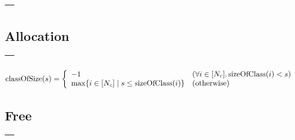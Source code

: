 \begin{center}
  \begin{tabular}{|p{}|}
    \hline
    \begin{algorithmic}
      \Ensure{$H$}
      \For{$i \in [N_c]$}
        \State{$V_i \assign (\mathrm{sizeOfClass(i)}, \epsilon)$}
      \EndFor
      \State{$H \assign (\{V_i\}_{i \in [N_c]}, \epsilon)$}
    \end{algorithmic}
    \\\hline
  \end{tabular}
\end{center}

\subsection{Allocation}

\begin{center}
  \begin{tabular}{|p{}|}
    \hline
    \begin{algorithmic}
      \Require{$H, s$}
      \Ensure{$H, b$}
      \State{$i = \mathrm{classOfSize}(s)$}
      \If{$i = -1$}
        \State{$b \assign \mathrm{allocFreeSize}(s)$}
      \Else
        \State{$V_i \assign \mathrm{subheap}_i(H)$}
        \If{$|\mathrm{seg}(V_i)| > 0$}
          \State{$S \assign \mathrm{seg}(V_i)(0)$}
        \ElsIf{$|\mathrm{free}(H)| > 0$}
          \State{$S \assign \mathrm{free}(H)(0)$}
        \Else
          \State{$a$}
        \EndIf
        \State{$\mathrm{return}\; 2$}
      \EndIf
    \end{algorithmic}
    \\\hline
  \end{tabular}
\end{center}

\begin{definition}
  \begin{align*}
    \mathrm{classOfSize}(s) &= \left\{\begin{array}{ll}
      -1 &(\forall i \in [N_c]\ldotp \mathrm{sizeOfClass}(i) < s) \\
      \max\{i \in [N_c] \mid s \leq \mathrm{sizeOfClass}(i)\} &(\text{otherwise})
    \end{array}\right.
  \end{align*}
\end{definition}

\subsection{Free}

\begin{center}
  \begin{tabular}{|p{}|}
    \hline
    \begin{algorithmic}
      \Require{$H, b$}
      \Ensure{$H$}
      \State{$\mathrm{return}\; 1$}
    \end{algorithmic}
    \\\hline
  \end{tabular}
\end{center}
